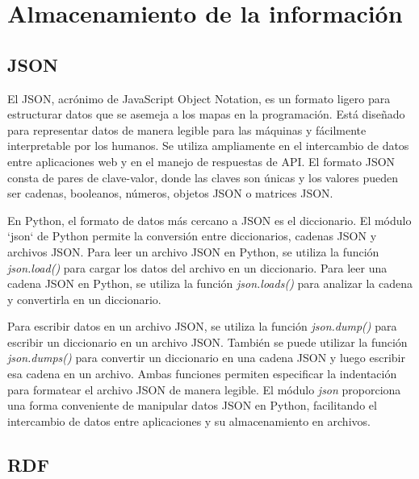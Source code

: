 \section{Almacenamiento de la información}	
\subsection{JSON}
El JSON, acrónimo de JavaScript Object Notation, es un formato ligero para estructurar datos que se asemeja a los mapas en la programación. Está diseñado para representar datos de manera legible para las máquinas y fácilmente interpretable por los humanos. Se utiliza ampliamente en el intercambio de datos entre aplicaciones web y en el manejo de respuestas de API. El formato JSON consta de pares de clave-valor, donde las claves son únicas y los valores pueden ser cadenas, booleanos, números, objetos JSON o matrices JSON.

En Python, el formato de datos más cercano a JSON es el diccionario. El módulo `json` de Python permite la conversión entre diccionarios, cadenas JSON y archivos JSON. Para leer un archivo JSON en Python, se utiliza la función \textit{json.load()} para cargar los datos del archivo en un diccionario. Para leer una cadena JSON en Python, se utiliza la función  \textit{json.loads()} para analizar la cadena y convertirla en un diccionario.

Para escribir datos en un archivo JSON, se utiliza la función \textit{json.dump()} para escribir un diccionario en un archivo JSON. También se puede utilizar la función \textit{json.dumps()} para convertir un diccionario en una cadena JSON y luego escribir esa cadena en un archivo. Ambas funciones permiten especificar la indentación para formatear el archivo JSON de manera legible. El módulo \textit{json} proporciona una forma conveniente de manipular datos JSON en Python, facilitando el intercambio de datos entre aplicaciones y su almacenamiento en archivos.

\subsection{RDF}


